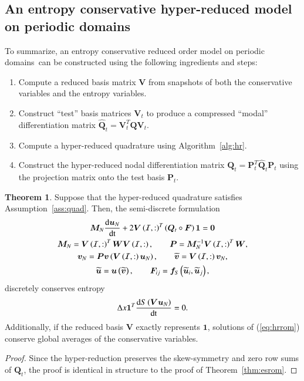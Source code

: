 \documentclass[preprint,10pt]{elsarticle}
\theoremstyle{definition}
\theoremstyle{lemma}
\theoremstyle{theorem}
\newtheorem{theorem}{Theorem}
\theoremstyle{assumption}
\renewcommand{\hat}{\widehat}
\renewcommand{\tilde}{\widetilde}
\newcommand{\td}[2]{\frac{{\rm d}#1}{{\rm d}{\rm #2}}}
\newcommand{\LRp}[1]{\left( #1 \right)}
\newcommand{\note}[1]{{\color{blue}{#1}}}
\begin{document}
 
\subsection{An entropy conservative hyper-reduced model on periodic domains}

To summarize, an entropy conservative reduced order model on periodic domains can be constructed using the following ingredients and steps:
\begin{enumerate}
\item Compute a reduced basis matrix $\bm{V}$ from snapshots of both the conservative variables and the entropy variables.  
\item Construct ``test'' basis matrices $\bm{V}_t$ to produce a compressed ``modal'' differentiation matrix $\hat{\bm{Q}}_t = \bm{V}_t^T\bm{Q}\bm{V}_t$.
\item Compute a hyper-reduced quadrature using Algorithm~\ref{alg:hr}.  
\item Construct the hyper-reduced nodal differentiation matrix $\bm{Q}_t = \bm{P}_t^T\hat{\bm{Q}}_t\bm{P}_t$ using the projection matrix onto the test basis $\bm{P}_t$.
\end{enumerate}

\begin{theorem}
Suppose that the hyper-reduced quadrature satisfies Assumption~\ref{ass:quad}.  Then, the semi-discrete formulation 
\begin{gather}
\bm{M}_N\td{\bm{u}_N}{t} + 2\bm{V}\LRp{\mathcal{I},:}^T\LRp{\bm{Q}_t \circ \bm{F}}\bm{1} = \bm{0} \label{eq:hrrom}\\
\bm{M}_N = \bm{V}\LRp{\mathcal{I},:}^T\bm{W}\bm{V}\LRp{\mathcal{I},:}, \qquad \bm{P} = \bm{M}_N^{-1}\bm{V}\LRp{\mathcal{I},:}^T\bm{W},\nonumber\\ 
\bm{v}_N = \bm{P}\bm{v}\LRp{\bm{V}\LRp{\mathcal{I},:}\bm{u}_N}, \qquad \tilde{\bm{v}} = \bm{V}\LRp{\mathcal{I},:}\bm{v}_N, \nonumber\\
\tilde{\bm{u}} = \bm{u}\LRp{\tilde{\bm{v}}}, \qquad \bm{F}_{ij} = \bm{f}_S\LRp{\tilde{\bm{u}}_i,\tilde{\bm{u}}_j},\nonumber
\end{gather}
discretely conserves entropy 
\[
\Delta x \bm{1}^T\td{S\LRp{\bm{V}\bm{u}_N}}{t} = 0.  
\]
Additionally, if the reduced basis $\bm{V}$ exactly represents $\bm{1}$, solutions of (\ref{eq:hrrom}) conserve global averages of the conservative variables.
\label{thm:hrromes}
\end{theorem}
\begin{proof}
Since the hyper-reduction preserves the skew-symmetry and zero row sums of $\bm{Q}_t$, the proof is identical in structure to the proof of Theorem~\ref{thm:esrom}.  
\end{proof}
\end{document}
